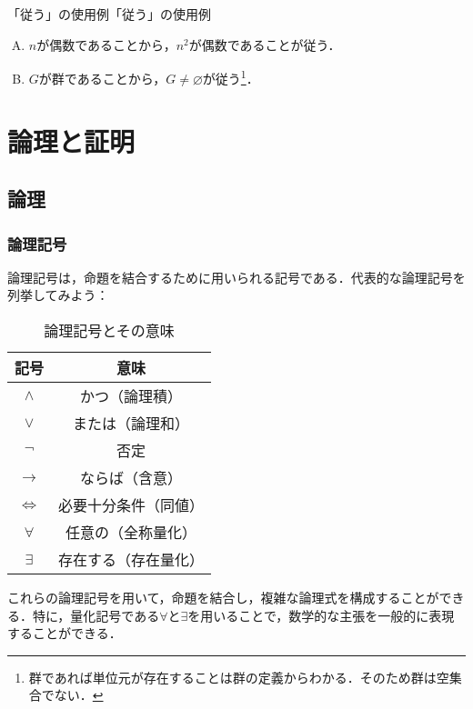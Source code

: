 \documentclass[a4paper,11pt]{ltjsarticle}
\begin{document}
\begin{example}{「従う」の使用例}{「従う」の使用例}
    \begin{enumerate}[(A)]
  \item $n$が偶数であることから，$n^2$が偶数であることが従う．\label{enu:偶数ならば偶数}
  \item $G$が群であることから，$G \ne \varnothing$が従う\footnote{群であれば単位元が存在することは群の定義からわかる．そのため群は空集合でない．}．\label{enu:群の例}
\end{enumerate}
\end{example}


\newpage 

\section{論理と証明}
\subsection{論理}
\subsubsection{論理記号}

	論理記号は，命題を結合するために用いられる記号である．代表的な論理記号を列挙してみよう：

	\begin{table}[ht]
		\centering
		\caption{論理記号とその意味}
		\begin{tabular}{c|c}
		\hline
		記号 & 意味 \\
		\hline
    $\land$ & かつ（論理積\index{ろんりせき@論理積}） \\
    $\lor$ & または（論理和\index{ろんりわ@論理和}） \\
    $\lnot$ & 否定\index{ひてい@否定} \\
    $\to$ & ならば（含意\index{がんい@含意}） \\
    $\Leftrightarrow$ & 必要十分条件（同値）\index{どうち@同値} \\
    $\forall$ & 任意の（全称量化\index{ぜんしょうりょうか@全称量化}） \\
    $\exists$ & 存在する（存在量化\index{そんざいりょうか@存在量化}） \\
		\hline
		\end{tabular}
		\end{table}

    これらの論理記号を用いて，命題を結合し，複雑な論理式を構成することができる．特に，量化記号である$\forall$と$\exists$を用いることで，数学的な主張を一般的に表現することができる．
\end{document}

